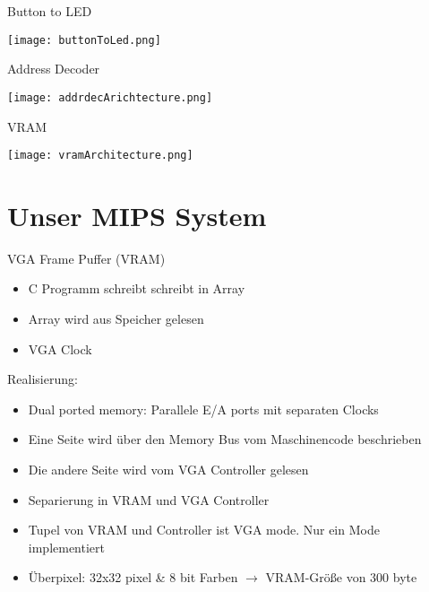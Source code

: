 \begin{frame}{Button to LED}
\begin{center}
\texttt{[image: buttonToLed.png]}
\end{center} 
\end{frame}

\begin{frame}{Address Decoder}
\begin{center}
\texttt{[image: addrdecArichtecture.png]}
\end{center} 
\end{frame}

\begin{frame}{VRAM}
\begin{center}
\texttt{[image: vramArchitecture.png]}
\end{center} 
\end{frame}

\section{Unser MIPS System}

\begin{frame}{VGA Frame Puffer (VRAM)}
	\begin{itemize}
		\item C Programm schreibt schreibt in Array
		\item Array wird aus Speicher gelesen
		\item VGA Clock
	\end{itemize}
	\pause
	Realisierung:
	\begin{itemize}
		\item Dual ported memory: Parallele E/A ports mit separaten Clocks
		\item Eine Seite wird über den Memory Bus vom Maschinencode beschrieben
		\item Die andere Seite wird vom VGA Controller gelesen
		\item Separierung in VRAM und VGA Controller
		\item Tupel von VRAM und Controller ist VGA mode. Nur ein Mode implementiert
		\item Überpixel: 32x32 pixel \& 8 bit Farben $\rightarrow$ VRAM-Größe von 300 byte
	\end{itemize}

\end{frame}

